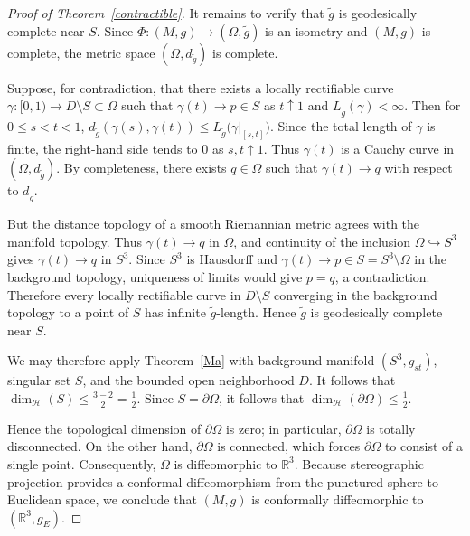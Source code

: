 \documentclass[12pt,oneside,a4paper]{article}
\theoremstyle{mytheorem}
\theoremstyle{remark}
\theoremstyle{definition}
\begin{document}
\begin{proof}[Proof of Theorem~\ref{contractible}]
It remains to verify that \(\tilde g\) is geodesically complete near \(S\).
Since \(\Phi\colon(M,g)\to(\Omega,\tilde g)\) is an isometry and \((M,g)\) is complete,
the metric space \((\Omega,d_{\tilde g})\) is complete.

Suppose, for contradiction, that there exists a locally rectifiable curve
\(\gamma\colon[0,1)\to D\setminus S\subset\Omega\)
such that \(\gamma(t)\to p\in S\) as \(t\uparrow 1\) and
$L_{\tilde g}(\gamma)<\infty.$ Then for \(0\le s<t<1\),
\(d_{\tilde g}(\gamma(s),\gamma(t))
\le L_{\tilde g}\bigl(\gamma|_{[s,t]}\bigr)\).
Since the total length of \(\gamma\) is finite, the right-hand side tends to \(0\)
as \(s,t\uparrow 1\). Thus \(\gamma(t)\) is a Cauchy curve in
\((\Omega,d_{\tilde g})\). By completeness, there exists \(q\in \Omega\) such that
\(\gamma(t)\to q\) with respect to \(d_{\tilde g}\).

But the distance topology of a smooth Riemannian metric agrees with the manifold
topology. Thus \(\gamma(t)\to q\) in \(\Omega\), and continuity of the inclusion
\(\Omega\hookrightarrow S^3\) gives \(\gamma(t)\to q\) in \(S^3\). Since \(S^3\)
is Hausdorff and \(\gamma(t)\to p\in S=S^3\setminus\Omega\) in the background
topology, uniqueness of limits would give \(p=q\), a contradiction.
Therefore every locally rectifiable curve in \(D\setminus S\) converging in the
background topology to a point of \(S\) has infinite \(\tilde g\)-length.
Hence \(\tilde g\) is geodesically complete near \(S\).

We may therefore apply Theorem~\ref{Ma} with background manifold
\((S^3,g_{st})\), singular set \(S\), and the bounded open
neighborhood \(D\). It follows that
\(\dim_{\mathcal H}(S)\le \frac{3-2}{2}=\frac12.\) Since
\(S=\partial\Omega\), it follows that
$\dim_{\mathcal H}(\partial\Omega)\le \frac12.$

Hence the topological dimension of \(\partial\Omega\) is zero; in particular, \(\partial\Omega\) is totally disconnected. On the other hand, \(\partial\Omega\) is connected, which forces \(\partial\Omega\) to consist of a single point. Consequently, $\Omega$ is diffeomorphic to $\mathbb{R}^3$. Because stereographic projection provides a conformal diffeomorphism from the punctured sphere to Euclidean space, we conclude that $(M,g)$ is conformally diffeomorphic to $(\mathbb R^3, g_E)$.
\end{proof}
\end{document}

